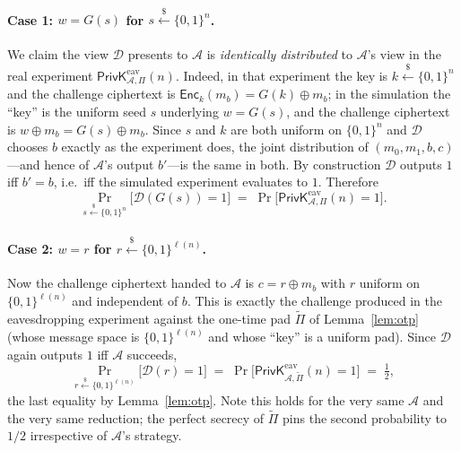 \documentclass[11pt]{article}
\theoremstyle{plain}
\theoremstyle{definition}
\newcommand{\bit}{\{0,1\}}
\newcommand{\secp}{n}                       %
\newcommand{\adv}{\mathcal{A}}
\newcommand{\dist}{\mathcal{D}}
\newcommand{\Enc}{\mathsf{Enc}}
\newcommand{\getsr}{\overset{\$}{\leftarrow}}   %
\newcommand{\PrivK}{\mathsf{PrivK}}
\newcommand{\eav}{\mathrm{eav}}
\newcommand{\Pron}{\Pi}
\newcommand{\Ptilde}{\widetilde{\Pi}}
\begin{document}
\paragraph{Case 1: $w = G(s)$ for $s \getsr \bit^{\secp}$.} We claim the view
$\dist$ presents to $\adv$ is \emph{identically distributed} to $\adv$'s view in
the real experiment $\PrivK^{\eav}_{\adv,\Pron}(\secp)$. Indeed, in that
experiment the key is $k \getsr \bit^{\secp}$ and the challenge ciphertext is
$\Enc_k(m_b) = G(k) \oplus m_b$; in the simulation the ``key'' is the uniform
seed $s$ underlying $w = G(s)$, and the challenge ciphertext is
$w \oplus m_b = G(s) \oplus m_b$. Since $s$ and $k$ are both uniform on
$\bit^{\secp}$ and $\dist$ chooses $b$ exactly as the experiment does, the joint
distribution of $(m_0, m_1, b, c)$---and hence of $\adv$'s output $b'$---is the
same in both. By construction $\dist$ outputs $1$ iff $b' = b$, i.e.\ iff the
simulated experiment evaluates to $1$. Therefore
\begin{equation}\label{eq:case1}
  \Pr_{s \getsr \bit^{\secp}}\!\bigl[\dist(G(s)) = 1\bigr]
  \;=\;
  \Pr\!\bigl[\PrivK^{\eav}_{\adv,\Pron}(\secp) = 1\bigr] .
\end{equation}

\paragraph{Case 2: $w = r$ for $r \getsr \bit^{\ell(\secp)}$.} Now the challenge
ciphertext handed to $\adv$ is $c = r \oplus m_b$ with $r$ uniform on
$\bit^{\ell(\secp)}$ and independent of $b$. This is exactly the challenge
produced in the eavesdropping experiment against the one-time pad $\Ptilde$ of
Lemma~\ref{lem:otp} (whose message space is $\bit^{\ell(\secp)}$ and whose
``key'' is a uniform pad). Since $\dist$ again outputs $1$ iff $\adv$ succeeds,
\[
  \Pr_{r \getsr \bit^{\ell(\secp)}}\!\bigl[\dist(r) = 1\bigr]
  \;=\;
  \Pr\!\bigl[\PrivK^{\eav}_{\adv,\Ptilde}(\secp) = 1\bigr]
  \;=\; \tfrac{1}{2},
\]
the last equality by Lemma~\ref{lem:otp}. Note this holds for the very same $\adv$
and the very same reduction; the perfect secrecy of $\Ptilde$ pins the second
probability to $1/2$ irrespective of $\adv$'s strategy.
\end{document}
